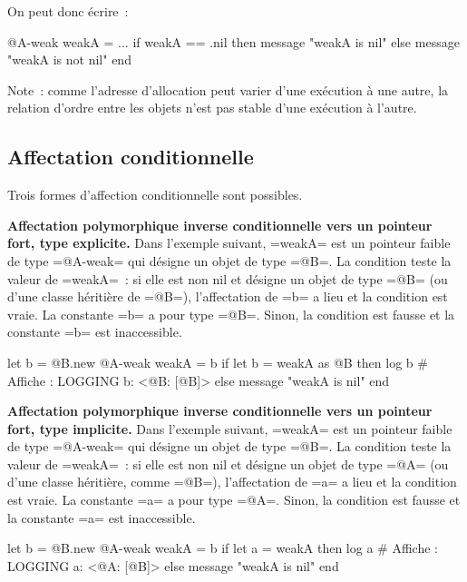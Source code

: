 On peut donc écrire~:
\begin{galgas}
  @A-weak weakA = ...
  if weakA == .nil then
    message "weakA is nil\n"
  else
    message "weakA is not nil\n"
  end
\end{galgas}


Note~: comme l'adresse d'allocation peut varier d'une exécution à une autre, la relation d'ordre entre les objets n'est pas stable d'une exécution à l'autre.




\subsection{Affectation conditionnelle}

Trois formes d'affection conditionnelle sont possibles.

{\bf Affectation polymorphique inverse conditionnelle vers un pointeur fort, type explicite.}  Dans l'exemple suivant, \ggs=weakA= est un pointeur faible de type \ggs=@A-weak= qui désigne un objet de type \ggs=@B=. La condition teste la valeur de \ggs=weakA=~: si elle est non nil et désigne un objet de type \ggs=@B= (ou d'une classe héritière de \ggs=@B=), l'affectation de \ggs=b= a lieu et la condition est vraie. La constante \ggs=b= a pour type \ggs=@B=. Sinon, la condition est fausse et la constante \ggs=b= est inaccessible.

\begin{galgas}
  let b = @B.new
  @A-weak weakA = b
  if let b = weakA as @B then
    log b # Affiche : LOGGING b: <@B: [@B]>
  else
    message "weakA is nil\n"
  end
\end{galgas}


{\bf Affectation polymorphique inverse conditionnelle vers un pointeur fort, type implicite.}  Dans l'exemple suivant, \ggs=weakA= est un pointeur faible de type \ggs=@A-weak= qui désigne un objet de type \ggs=@B=. La condition teste la valeur de \ggs=weakA=~: si elle est non nil et désigne un objet de type \ggs=@A= (ou d'une classe héritière, comme \ggs=@B=), l'affectation de \ggs=a= a lieu et la condition est vraie. La constante \ggs=a= a pour type \ggs=@A=. Sinon, la condition est fausse et la constante \ggs=a= est inaccessible.

\begin{galgas}
  let b = @B.new
  @A-weak weakA = b
  if let a = weakA then
    log a # Affiche : LOGGING a: <@A: [@B]>
  else
    message "weakA is nil\n"
  end
\end{galgas}


